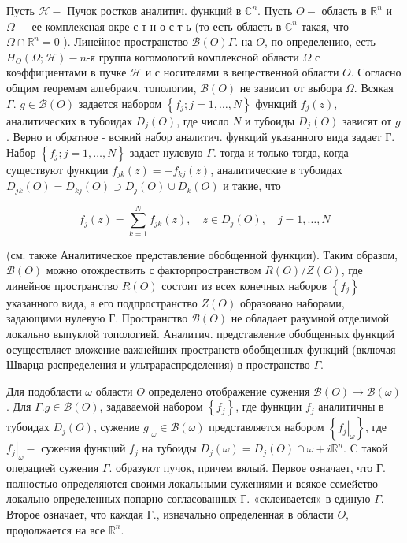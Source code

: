\documentclass[10pt]{article}
\begin{document}
Пусть $\mathscr{H}-$ Пучок ростков аналитич. функций в $\mathbb{C}^{n}$. Пусть $O-$ область в $\mathbb{R}^{n}$ и $\Omega-$ ее комплексная окре с т н о с т ь (то есть область в $\mathbb{C}^{n}$ такая, что $\Omega \cap \mathbb{R}^{n}=0$ ). Линейное пространство $\mathscr{B}(O) \Gamma$. на $O$, по определению, есть $H_{O}(\Omega ; \mathscr{H})-n$-я группа когомологий комплексной области $\Omega$ с коэффициентами в пучке $\mathscr{H}$ и с носителями в вещественной области $O$. Согласно общим теоремам алгебраич. топологии, $\mathscr{B}(O)$ не зависит от выбора $\Omega$. Всякая $\Gamma$. $g \in \mathscr{B}(O)$ задается набором $\left\{f_{j} ; j=1, \ldots, N\right\}$ функций $f_{j}(z)$, аналитических в тубоидах $D_{j}(O)$, где число $N$ и тубоиды $D_{j}(O)$ зависят от $g$. Верно и обратное - всякий набор аналитич. функций указанного вида задает Г. Набор $\left\{f_{j} ; j=1, \ldots, N\right\}$ задает нулевую $\Gamma$. тогда и только тогда, когда существуют функции $f_{j k}(z)=-f_{k j}(z)$, аналитические в тубоидах $D_{j k}(O)=D_{k j}(O) \supset D_{j}(O) \cup D_{k}(O)$ и такие, что



\[

f_{j}(z)=\sum_{k=1}^{N} f_{j k}(z), \quad z \in D_{j}(O), \quad j=1, \ldots, N

\]



(см. также Аналитическое представление обобщенной функции). Таким образом, $\mathscr{B}(O)$ можно отождествить с факторпространством $R(O) / Z(O)$, где линейное пространство $R(O)$ состоит из всех конечных наборов $\left\{f_{j}\right\}$ указанного вида, а его подпространство $Z(O)$ образовано наборами, задающими нулевую Г. Пространство $\mathscr{B}(O)$ не обладает разумной отделимой локально выпуклой топологией. Аналитич. представление обобщенных функций осуществляет вложение важнейших пространств обобщенных функций (включая Шварца распределения и ультрараспределения) в пространство $\Gamma$.



Для подобласти $\omega$ области $O$ определено отображение сужения $\mathscr{B}(O) \rightarrow \mathscr{B}(\omega)$. Для $\Gamma . g \in \mathscr{B}(O)$, задаваемой набором $\left\{f_{j}\right\}$, где функции $f_{j}$ аналитичны в тубоидах $D_{j}(O)$, сужение $\left.g\right|_{\omega} \in \mathscr{B}(\omega)$ представляется набором $\left\{\left.f_{j}\right|_{\omega}\right\}$, где $\left.f_{j}\right|_{\omega}-$ сужения функций $f_{j}$ на тубоиды $D_{j}(\omega)=D_{j}(O) \cap \omega+i \mathbb{R}^{n}$. C такой операцией сужения $\Gamma$. образуют пучок, причем вялый. Первое означает, что Г. полностью определяются своими локальными сужениями и всякое семейство локально определенных попарно согласованных Г. «склеивается» в единую $\Gamma$. Второе означает, что каждая Г., изначально определенная в области $O$, продолжается на все $\mathbb{R}^{n}$.
\end{document}
